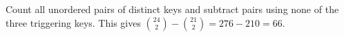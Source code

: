 Count all unordered pairs of distinct keys and subtract pairs using none of the three triggering keys. This gives $\binom{24}{2}-\binom{21}{2}=276-210=\boxed{66}$.
